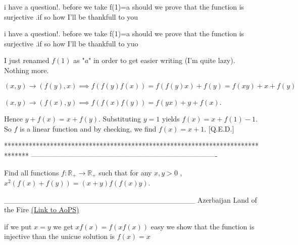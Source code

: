 \begin{solution}
	i have a question!. before we take f(1)=a 
should we prove that the function is surjective .if so how 
I'll be thankfull to you
\end{solution}



\begin{solution}
	\begin{tcolorbox}i have a question!. before we take f(1)=a 
should we prove that the function is surjective .if so how 
I'll be thankfull to yuo\end{tcolorbox}
I just renamed $f(1)$ as "$a$" in order to get easier writing (I'm quite lazy). Nothing more.
\end{solution}



\begin{solution}
	$(x,y)\rightarrow (f(y),x)\implies f(f(y)f(x))=f(f(y)x)+f(y)=f(xy)+x+f(y)$

$(x,y)\rightarrow (f(x),y)\implies f(f(x)f(y))=f(yx)+y+f(x)$. 

Hence $y+f(x)=x+f(y)$. Substituting $y=1$ yields $f(x)=x+f(1)-1$. So $f$ is a linear function and by checking, we find $f(x)=x+1$.
[Q.E.D.]
\end{solution}
*******************************************************************************
-------------------------------------------------------------------------------

\begin{problem}
	Find all functions $f: \mathbb{R_+}\to\mathbb{R_+}$ such that for any  $x,y>0$ , $x^2(f(x)+f(y))=(x+y)f(f(x)y)$.


____________________________________
Azerbaijan Land of the Fire 
	\flushright \href{https://artofproblemsolving.com/community/c6h530779}{(Link to AoPS)}
\end{problem}



\begin{solution}
	if we put $x=y$ we get  $xf(x)=f(xf(x))$
easy we show that the function is injective than the unicue solution is $f(x)=x$
\end{solution}




